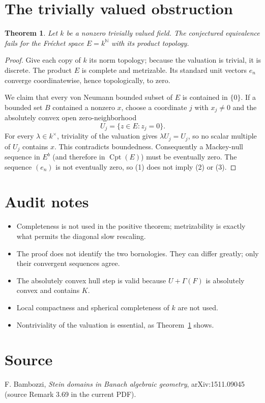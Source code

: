 \documentclass[11pt]{article}
\newtheorem{theorem}{Theorem}
\newcommand{\Cpt}{\operatorname{Cpt}}
\newcommand{\Ga}{\Gamma}
\begin{document}
\section*{The trivially valued obstruction}

\begin{theorem}\label{thm:negative}
Let $k$ be a nonzero trivially valued field.  The conjectured equivalence fails for the Fr\'echet space $E=k^{\mathbb N}$ with its product topology.
\end{theorem}

\begin{proof}
Give each copy of $k$ its norm topology; because the valuation is trivial, it is discrete.  The product $E$ is complete and metrizable.  Its standard unit vectors $e_n$ converge coordinatewise, hence topologically, to zero.

We claim that every von Neumann bounded subset of $E$ is contained in $\{0\}$.  If a bounded set $B$ contained a nonzero $x$, choose a coordinate $j$ with $x_j\neq0$ and the absolutely convex open zero-neighborhood
\[
 U_j=\{z\in E:z_j=0\}.
\]
For every $\lambda\in k^\times$, triviality of the valuation gives
$\lambda U_j=U_j$, so no scalar multiple of $U_j$ contains $x$.  This contradicts boundedness.  Consequently a Mackey-null sequence in $E^b$ (and therefore in $\Cpt(E)$) must be eventually zero.  The sequence $(e_n)$ is not eventually zero, so (1) does not imply (2) or (3).
\end{proof}

\section*{Audit notes}
\begin{itemize}[leftmargin=1.4em,itemsep=2pt]
\item Completeness is not used in the positive theorem; metrizability is exactly what permits the diagonal slow rescaling.
\item The proof does not identify the two bornologies.  They can differ greatly; only their convergent sequences agree.
\item The absolutely convex hull step is valid because $U+\Ga(F)$ is absolutely convex and contains $K$.
\item Local compactness and spherical completeness of $k$ are not used.
\item Nontriviality of the valuation is essential, as Theorem~\ref{thm:negative} shows.
\end{itemize}

\section*{Source}
F. Bambozzi, \emph{Stein domains in Banach algebraic geometry}, arXiv:1511.09045 (source Remark 3.69 in the current PDF).
\end{document}
